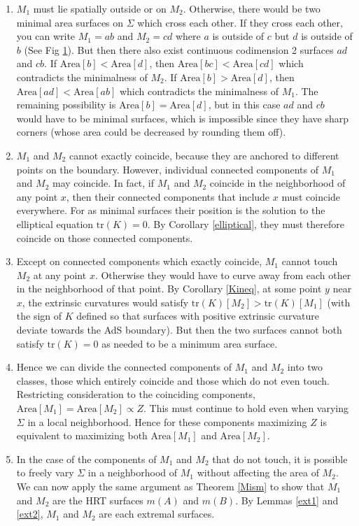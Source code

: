 \documentclass[12pt]{article}
\begin{document}
\begin{enumerate}[resume]
\begin{enumerate}
\begin{figure}[hbt]
{}\label{cross}
\end{figure}
	\item \label{crossing} $M_1$ must lie spatially outside or on $M_2$.  Otherwise, there would be two minimal area surfaces on $\Sigma$ which cross each other.  If they cross each other, you can write $M_1 = ab$ and $M_2 = cd$ where $a$ is outside of $c$ but $d$ is outside of $b$ (See Fig \ref{cross}).  But then there also exist continuous codimension 2 surfaces $ad$ and $cb$.  If $\mathrm{Area}[b] < \mathrm{Area}[d]$, then $\mathrm{Area}[bc] < \mathrm{Area}[cd]$ which contradicts the minimalness of $M_2$.  If $\mathrm{Area}[b] > \mathrm{Area}[d]$, then $\mathrm{Area}[ad] < \mathrm{Area}[ab]$ which contradicts the minimalness of $M_1$.  The remaining possibility is $\mathrm{Area}[b] = \mathrm{Area}[d]$, but in this case $ad$ and $cb$ would have to be minimal surfaces, which is impossible since they have sharp corners (whose area could be decreased by rounding them off).
	\item $M_1$ and $M_2$ cannot exactly coincide, because they are anchored to different points on the boundary.  However, individual connected components of $M_1$ and $M_2$ may coincide.  In fact, if $M_1$ and $M_2$ coincide in the neighborhood of any point $x$, then their connected components that include $x$ must coincide everywhere.  For as minimal surfaces their position is the solution to the elliptical equation $\mathrm{tr}(K) = 0$.  By Corollary \ref{elliptical}, they must therefore coincide on those connected components. 
	\item Except on connected components which exactly coincide, $M_1$ cannot touch $M_2$ at any point $x$.  Otherwise they would have to curve away from each other in the neighborhood of that point.  By Corollary \ref{Kineq}, at some point $y$ near $x$, the extrinsic curvatures would satisfy 
$\mathrm{tr}(K)[M_2] > \mathrm{tr}(K)[M_1]$ (with the sign of $K$ defined so that surfaces with positive extrinsic curvature deviate towards the AdS boundary).  But then the two surfaces cannot both satisfy $\mathrm{tr}(K) = 0$ as needed to be a minimum area surface.
	\item Hence we can divide the connected components of $M_1$ and $M_2$ into two classes, those which entirely coincide and those which do not even touch.  Restricting consideration to the coinciding components, $\mathrm{Area}[M_1] = \mathrm{Area}[M_2] \propto Z$.  This must continue to hold even when varying $\Sigma$ in a local neighborhood.  Hence for these components maximizing $Z$ is equivalent to maximizing both $\mathrm{Area}[M_1]$ and $\mathrm{Area}[M_2]$.
	\item In the case of the components of $M_1$ and $M_2$ that do not touch, it is possible to freely vary $\Sigma$ in a neighborhood of $M_1$ without affecting the area of $M_2$.  We can now apply the same argument as Theorem \ref{Mism} to show that $M_1$ and $M_2$ are the HRT surfaces $m(A)$ and $m(B)$.  By Lemmas \ref{ext1} and \ref{ext2}, $M_1$ and $M_2$ are each extremal surfaces.


\end{enumerate}
\end{enumerate}
\end{document}
